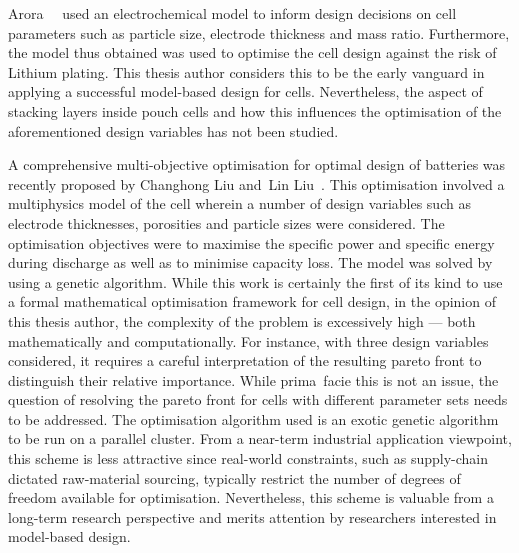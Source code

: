 Arora~\etal~\cite{Arora1999}  used an  electrochemical  model  to inform  design
decisions on cell parameters such as particle size, electrode thickness and mass
ratio. Furthermore, the model thus obtained was used to optimise the cell design
against the  risk of Lithium  plating. This thesis  author considers this  to be
the  early vanguard  in  applying  a successful  model-based  design for  cells.
Nevertheless, the  aspect of  stacking layers  inside pouch  cells and  how this
influences the optimisation of the  aforementioned design variables has not been
studied.

A  comprehensive multi-objective  optimisation for  optimal design  of batteries
was  recently  proposed  by  Changhong  Liu  and~Lin  Liu~\cite{Liu2017b}.  This
optimisation  involved a  multiphysics model  of the  cell wherein  a number  of
design variables  such as electrode  thicknesses, porosities and  particle sizes
were considered. The optimisation objectives were to maximise the specific power
and specific energy  during discharge as well as to  minimise capacity loss. The
model was solved by using a genetic  algorithm. While this work is certainly the
first of its  kind to use a formal mathematical  optimisation framework for cell
design, in the opinion  of this thesis author, the complexity  of the problem is
excessively high --- both mathematically and computationally. For instance, with
three  design variables  considered,  it requires  a  careful interpretation  of
the  resulting pareto  front  to distinguish  their  relative importance.  While
prima~facie this is not an issue, the question of resolving the pareto front for
cells  with different  parameter sets  needs to  be addressed.  The optimisation
algorithm  used  is  an  exotic  genetic  algorithm to  be  run  on  a  parallel
cluster.  From a  near-term  industrial application  viewpoint,  this scheme  is
less  attractive since  real-world  constraints, such  as supply-chain  dictated
raw-material  sourcing, typically  restrict  the number  of  degrees of  freedom
available  for  optimisation.  Nevertheless,  this scheme  is  valuable  from  a
long-term research perspective and merits attention by researchers interested in
model-based design.

